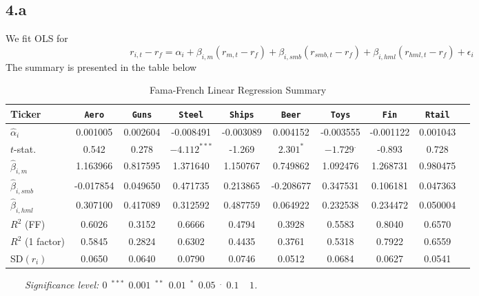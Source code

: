 \documentclass[10 pt]{hwtemplate} %
\begin{document}
\subsection*{4.a} 
We fit OLS for 
$$
r_{i,t} - r_f = \alpha_i + \beta_{i,m} (r_{m,t}-r_f) + \beta_{i,smb} (r_{smb,t}-r_f) + \beta_{i,hml} (r_{hml,t}-r_f) + \epsilon_i
$$
The summary is presented in the table below
\begin{table}[htbp]
  \begin{center}
  \captionsetup{justification=centering}
  \caption{\label{tab:lm2}Fama-French Linear Regression Summary}
  \small
    \begin{tabular}{lccccccccc}
    \toprule
      Ticker & \texttt{Aero} & \texttt{Guns} & \texttt{Steel}& \texttt{Ships}& \texttt{Beer}& \texttt{Toys}& \texttt{Fin}&  \texttt{Rtail}\\
      \midrule
      $\hat{\alpha}_i$      & 0.001005  &0.002604  & -0.008491  &-0.003089  & 0.004152  &-0.003555 & -0.001122 & 0.001043 \\
      $t$-stat.             & 0.542  &0.278  & $-4.112^{***}$  &-1.269 & $2.301^{*}$  &$-1.729^{.}$& -0.893 & 0.728 \\
      \midrule
      $\hat{\beta}_{i,m}$   & 1.163966  &0.817595  & 1.371640   &1.150767   & 0.749862  &1.092476  & 1.268731 & 0.980475 \\
      $\hat{\beta}_{i,smb}$ & -0.017854  &0.049650  & 0.471735  &0.213865   & -0.208677  &0.347531  & 0.106181 & 0.047363 \\
      $\hat{\beta}_{i,hml}$ & 0.307100  &0.417089  & 0.312592   &0.487759   & 0.064922  &0.232538  & 0.234472 & 0.050004 \\
      $R^2$ (FF)            & 0.6026    &0.3152    & 0.6666     &0.4794     & 0.3928    &0.5583    & 0.8040 & 0.6570 \\
      $R^2$ (1 factor)      & 0.5845    &0.2824    & 0.6302     &0.4435     & 0.3761    &0.5318    & 0.7922 & 0.6559 \\
      SD$(r_i)$             & 0.0650    & 0.0640    & 0.0790     & 0.0746   & 0.0512    & 0.0684    & 0.0627 & 0.0541\\
    \bottomrule
    \end{tabular}
  \end{center}
    \vspace{-8pt}
  \scriptsize~~~~\textit{Significance level: $0~~^{***}~~0.001~~^{**}~~0.01~~^{*}~~0.05~~^{.}~~0.1~~~~~1$.}
\end{table}
\end{document}
